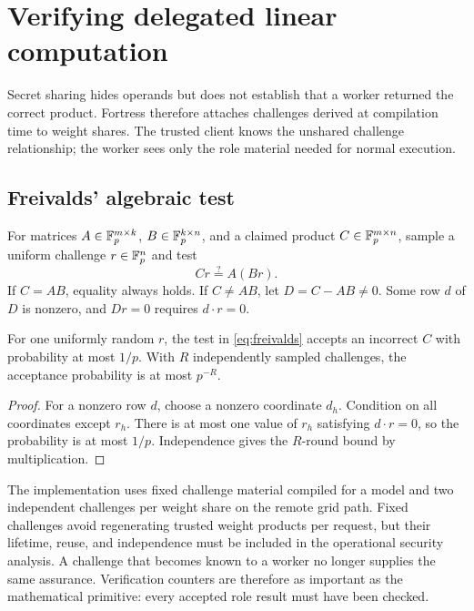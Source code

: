 \section{Verifying delegated linear computation}\label{sec:verification}

Secret sharing hides operands but does not establish that a worker returned the correct product. Fortress therefore attaches challenges derived at compilation time to weight shares. The trusted client knows the unshared challenge relationship; the worker sees only the role material needed for normal execution.

\subsection{Freivalds' algebraic test}

For matrices $A\in\mathbb{F}_{p}^{m\times k}$, $B\in\mathbb{F}_{p}^{k\times n}$, and a claimed product $C\in\mathbb{F}_{p}^{m\times n}$, sample a uniform challenge $r\in\mathbb{F}_{p}^n$ and test
\begin{equation}
C r \stackrel{?}{=} A(B r).
\label{eq:freivalds}
\end{equation}
If $C=AB$, equality always holds. If $C\neq AB$, let $D=C-AB\neq0$. Some row $d$ of $D$ is nonzero, and $Dr=0$ requires $d\cdot r=0$.

\begin{theorem}\label{thm:freivalds}
For one uniformly random $r$, the test in \cref{eq:freivalds} accepts an incorrect $C$ with probability at most $1/p$. With $R$ independently sampled challenges, the acceptance probability is at most $p^{-R}$.
\end{theorem}
\begin{proof}
For a nonzero row $d$, choose a nonzero coordinate $d_h$. Condition on all coordinates except $r_h$. There is at most one value of $r_h$ satisfying $d\cdot r=0$, so the probability is at most $1/p$. Independence gives the $R$-round bound by multiplication.
\end{proof}

The implementation uses fixed challenge material compiled for a model and two independent challenges per weight share on the remote grid path. Fixed challenges avoid regenerating trusted weight products per request, but their lifetime, reuse, and independence must be included in the operational security analysis. A challenge that becomes known to a worker no longer supplies the same assurance. Verification counters are therefore as important as the mathematical primitive: every accepted role result must have been checked.

